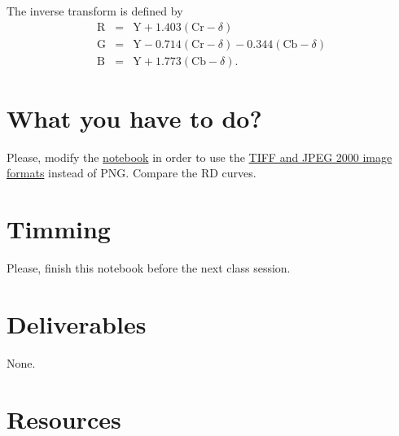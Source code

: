 The inverse transform is defined by
\begin{equation}
  \begin{array}{lcl}
    \text{R} & = & \text{Y} + 1.403(\text{Cr} - \delta) \\
    \text{G} & = & \text{Y} - 0.714(\text{Cr} - \delta) - 0.344(\text{Cb} - \delta)\\
    \text{B} & = & \text{Y} + 1.773(\text{Cb} - \delta).
  \end{array}
\end{equation}

\section{What you have to do?}
  
Please, modify the
\href{https://github.com/Sistemas-Multimedia/Sistemas-Multimedia.github.io/blob/master/study_guide/05-quantization/quantize_a_frame.ipynb}{notebook}
in order to use the
\href{https://docs.opencv.org/master/d4/da8/group__imgcodecs.html}{TIFF
  and JPEG 2000 image formats} instead of PNG. Compare the RD curves.

\section{Timming}

Please, finish this notebook before the next class session.

\section{Deliverables}

None.

\section{Resources}


